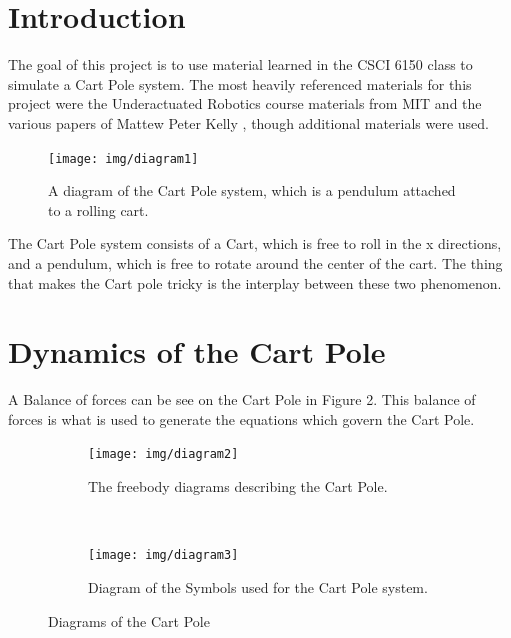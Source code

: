 \documentclass[12pt]{article}
\begin{document}
\maketitle

\section{Introduction}

The goal of this project is to use material learned in the CSCI 6150 class to simulate
a Cart Pole system. The most heavily referenced materials for this project were the
Underactuated Robotics course materials from MIT \cite{underactuated} and the various
papers of Mattew Peter Kelly \cite{mattkelly}, though additional materials were used.

\begin{figure}[!ht]
 \centering
 \texttt{[image: img/diagram1]}
 \caption{A diagram of the Cart Pole system, which is a pendulum attached to a rolling cart.\cite{mattkelly}}
 \label{fig:oof}
\end{figure}

The Cart Pole system consists of a Cart, which is free to roll in the x directions, and a
pendulum, which is free to rotate around the center of the cart. The thing that makes the
Cart pole tricky is the interplay between these two phenomenon.

\newpage

\section{Dynamics of the Cart Pole}

A Balance of forces can be see on the Cart Pole in Figure 2. This balance of forces
is what is used to generate the equations which govern the Cart Pole.

\begin{figure}[!ht]
    \centering
    \begin{subfigure}[b]{0.3\textwidth}
        \texttt{[image: img/diagram2]}
        \caption{The freebody diagrams describing the Cart Pole.\cite{mattkelly}}
        \label{fig:asd123}
    \end{subfigure}
    ~ %
    \begin{subfigure}[b]{0.3\textwidth}
        \texttt{[image: img/diagram3]}
        \caption{Diagram of the Symbols used for the Cart Pole system.}
        \label{fig:qwerty}
    \end{subfigure}
    \caption{Diagrams of the Cart Pole}\label{fig:asdfasdf}
\end{figure}
\end{document}
